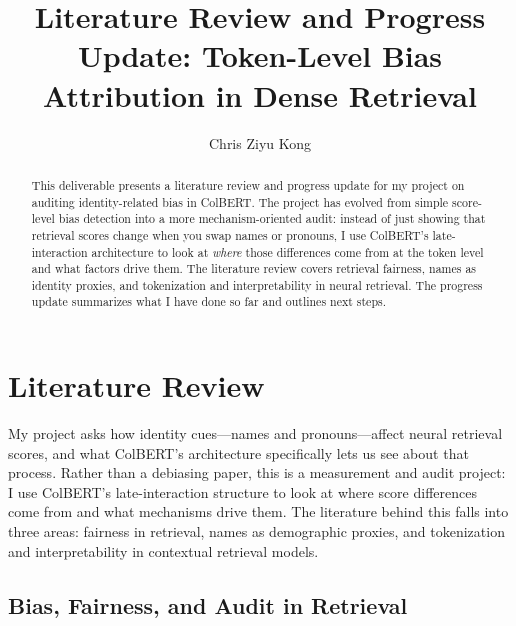 \documentclass[acmsmall,screen,review]{acmart}
\begin{document}
\title[Token-Level Bias Attribution in Dense Retrieval]{Literature Review and Progress Update: Token-Level Bias Attribution in Dense Retrieval}

\author{Chris Ziyu Kong}

\renewcommand{\shortauthors}{Kong}

\begin{abstract}
This deliverable presents a literature review and progress update for my project on auditing identity-related bias in ColBERT. The project has evolved from simple score-level bias detection into a more mechanism-oriented audit: instead of just showing that retrieval scores change when you swap names or pronouns, I use ColBERT's late-interaction architecture to look at \emph{where} those differences come from at the token level and what factors drive them. The literature review covers retrieval fairness, names as identity proxies, and tokenization and interpretability in neural retrieval. The progress update summarizes what I have done so far and outlines next steps.
\end{abstract}

\maketitle

\section{Literature Review}

My project asks how identity cues---names and pronouns---affect neural retrieval scores, and what ColBERT's architecture specifically lets us see about that process. Rather than a debiasing paper, this is a measurement and audit project: I use ColBERT's late-interaction structure to look at where score differences come from and what mechanisms drive them. The literature behind this falls into three areas: fairness in retrieval, names as demographic proxies, and tokenization and interpretability in contextual retrieval models.

\subsection{Bias, Fairness, and Audit in Retrieval}
\end{document}
